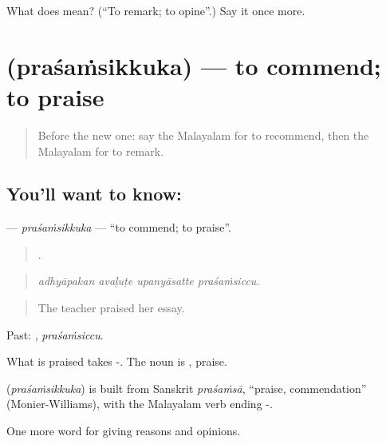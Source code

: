 \begin{tcolorbox}[breakable,colback=teal!4,colframe=teal!35!black,title={Before you move on}]
What does  mean? (\textquotedblleft{}To remark; to opine\textquotedblright{}.) Say it once more.
\end{tcolorbox}
\section[\texorpdfstring{\ml{പ്രശംസിക്കുക} (praśaṁsikkuka)}{പ്രശംസിക്കുക (praśaṁsikkuka)}]{ (praśaṁsikkuka) — to commend; to praise}

\label{lesson:ML-C413-prasamsikkuka}



\begin{quote}
Before the new one: say the Malayalam for to recommend, then the Malayalam for to remark.
\end{quote}

\subsection*{You'll want to know: }
\textbf{} — \emph{praśaṁsikkuka} — \textquotedblleft{}to commend; to praise\textquotedblright{}.

\begin{quote}
   .
\end{quote}

\begin{quote}
\emph{adhyāpakan avaḷuṭe upanyāsatte praśaṁsiccu.}
\end{quote}

\begin{quote}
The teacher praised her essay.
\end{quote}

Past: , \emph{praśaṁsiccu}.

What is praised takes -. The noun is , praise.

\begin{cousinweb}
\textbf{} (\emph{praśaṁsikkuka}) is built from Sanskrit \emph{praśaṁsā}, \textquotedblleft{}praise, commendation\textquotedblright{} (Monier-Williams), with the Malayalam verb ending -.
\end{cousinweb}

\begin{grammarlens}[title={What you've built}]
One more word for giving reasons and opinions.
\end{grammarlens}

